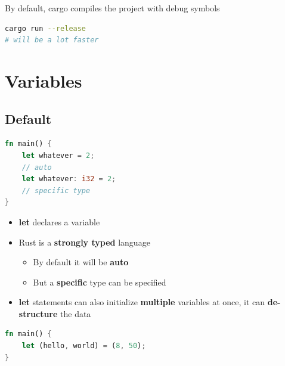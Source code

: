 \documentclass{report}
\begin{document}
\begin{multicols*}{2}
By default, cargo compiles the project with debug symbols
\begin{tcolorbox}[title=Disable Debug Symbols,colback=backcolour,size=small,left=4mm]
\begin{lstlisting}[language=bash]
cargo run --release
# will be a lot faster
\end{lstlisting}
\end{tcolorbox}


\section{Variables}

\subsection{Default}

\begin{tcolorbox}[title=Structure,colback=backcolour,size=small,left=4mm]
\begin{lstlisting}[language=rust]
fn main() {
	let whatever = 2;
	// auto
	let whatever: i32 = 2;
	// specific type
}
\end{lstlisting}
\end{tcolorbox}

\begin{itemize}
	\item \textbf{let} declares a variable 
	\item Rust is a \textbf{strongly typed} language
		\begin{itemize}
			\item By default it will be \textbf{auto} 
			\item But a \textbf{specific} type can be specified
		\end{itemize}
\end{itemize}

\begin{itemize}
	\item \textbf{let} statements can also initialize \textbf{multiple} variables at once, it can \textbf{de-structure} the data
\end{itemize}

\begin{tcolorbox}[title=Deconstruction Example,colback=backcolour,size=small,left=4mm]
\begin{lstlisting}[language=rust]
fn main() {
	let (hello, world) = (8, 50);
}
\end{lstlisting}
\end{tcolorbox}


\end{multicols*}
\end{document}
